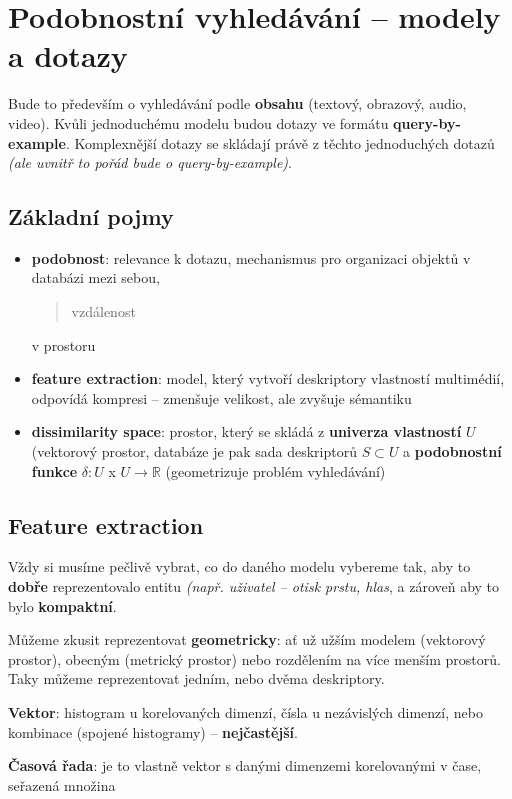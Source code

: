 \section{Podobnostní vyhledávání -- modely a dotazy}

Bude to především o vyhledávání podle \textbf{obsahu} (textový, obrazový, audio, video). Kvůli jednoduchému modelu budou dotazy ve formátu \textbf{query-by-example}. Komplexnější dotazy se skládají právě z těchto jednoduchých dotazů \textit{(ale uvnitř to pořád bude o query-by-example)}.

\subsection{Základní pojmy}

\begin{itemize}
    \item \textbf{podobnost}: relevance k dotazu, mechanismus pro organizaci objektů v databázi mezi sebou, \blockquote{vzdálenost} v prostoru
    \item \textbf{feature extraction}: model, který vytvoří deskriptory vlastností multimédií, odpovídá kompresi -- zmenšuje velikost, ale zvyšuje sémantiku
    \item \textbf{dissimilarity space}: prostor, který se skládá z \textbf{univerza vlastností} $U$ (vektorový prostor, databáze je pak sada deskriptorů $S \subset U$ a \textbf{podobnostní funkce} $\delta: U$ x $U \to \mathbb{R}$ (geometrizuje problém vyhledávání)
\end{itemize}

\subsection{Feature extraction}

Vždy si musíme pečlivě vybrat, co do daného modelu vybereme tak, aby to \textbf{dobře} reprezentovalo entitu \textit{(např. uživatel -- otisk prstu, hlas}, a zároveň aby to bylo \textbf{kompaktní}.

Můžeme zkusit reprezentovat \textbf{geometricky}: ať už užším modelem (vektorový prostor), obecným (metrický prostor) nebo rozdělením na více menším prostorů. Taky můžeme reprezentovat jedním, nebo dvěma deskriptory.

\textbf{Vektor}: histogram u korelovaných dimenzí, čísla u nezávislých dimenzí, nebo kombinace (spojené histogramy) -- \textbf{nejčastější}.

\textbf{Časová řada}: je to vlastně vektor s danými dimenzemi korelovanými v čase, seřazená množina

